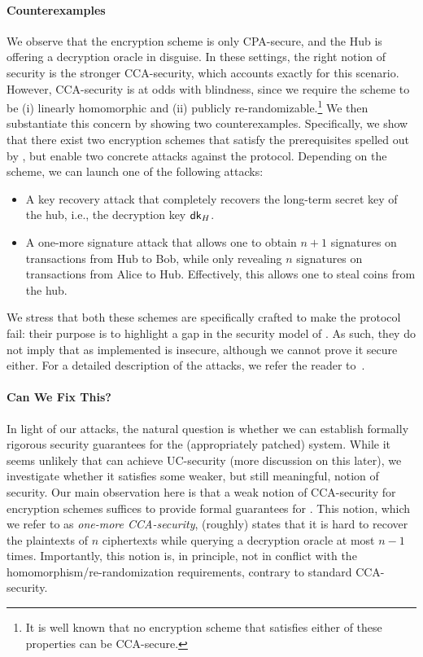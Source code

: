 \paragraph{Counterexamples} We observe that the encryption scheme is only CPA-secure, and the Hub is offering a decryption oracle in disguise. In these settings, the right notion of security is the stronger CCA-security, which accounts exactly for this scenario. However, CCA-security is at odds with blindness, since we require the scheme to be (i) linearly homomorphic and (ii) publicly re-randomizable.\footnote{It is well known that no encryption scheme that satisfies either of these properties can be CCA-secure.} We then substantiate this concern by showing two counterexamples. Specifically, we show that there exist two encryption schemes that satisfy the prerequisites spelled out by \aal, but enable two concrete attacks against the protocol. Depending on the scheme, we can launch one of the following attacks:
\begin{itemize}
    \item A key recovery attack that completely recovers the long-term secret key of the hub, i.e., the decryption key $\mathsf{dk}_H$.
    \item A one-more signature attack that allows one to obtain $n+1$ signatures on transactions from Hub to Bob, while only revealing $n$ signatures on transactions from Alice to Hub. Effectively, this allows one to steal coins from the hub.
\end{itemize}
We stress that both these schemes are specifically crafted to make the protocol fail: their purpose is to highlight a gap in the security model of \aal. As such, they do not imply that \aal as implemented is insecure, although we cannot prove it secure either. For a detailed description of the attacks, we refer the reader to~.

\paragraph{Can We Fix This?} In light of our attacks, the natural question is whether we can establish formally rigorous security guarantees for the (appropriately patched) \aal system. While it seems unlikely that \aal can achieve UC-security (more discussion on this later), we investigate whether it satisfies some weaker, but still meaningful, notion of security. Our main observation here is that a weak notion of CCA-security for encryption schemes suffices to provide formal guarantees for \aal. This notion, which we refer to as \emph{one-more CCA-security}, (roughly) states that it is hard to recover the plaintexts of $n$ ciphertexts while querying a decryption oracle at most $n-1$ times. Importantly, this notion is, in principle, not in conflict with the homomorphism/re-randomization requirements, contrary to standard CCA-security.

